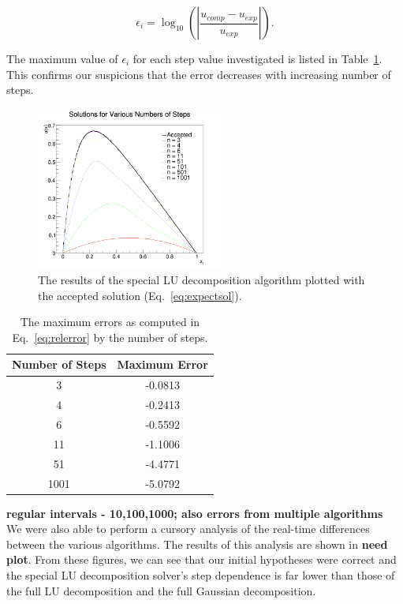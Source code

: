 \documentclass[12pt]{article}
\numberwithin{equation}{section}
\begin{document}
\begin{equation}
\label{eq:relerror}
\epsilon_{i} = \log_{10}\left(\left|\frac{u_{comp}-u_{exp}}{u_{exp}}\right|\right).
\end{equation}

\noindent The maximum value of $\epsilon_{i}$ for each step value investigated is listed in Table~\ref{tab:errors}.  This confirms our suspicions that the error decreases with increasing number of steps.

\begin{figure}[h]
\label{fig:result}
\begin{center}
\includegraphics[width=0.55\textwidth]{plots/solution_plot}
\caption{The results of the special LU decomposition algorithm plotted with the accepted solution (Eq.~\ref{eq:expectsol}).}
\end{center}
\end{figure}

\begin{table}[!h!tbp]
\label{tab:errors}
\begin{center}
\begin{tabular}{c|c}
\hline
Number of Steps & Maximum Error \\
\hline
3 & -0.0813 \\
4 & -0.2413 \\
6 & -0.5592 \\
11 & -1.1006 \\
51 & -4.4771 \\
1001 & -5.0792 \\
\hline
\end{tabular}
\caption{The maximum errors as computed in Eq.~\ref{eq:relerror} by the number of steps.}
\end{center}
\end{table}

\textbf{regular intervals - 10,100,1000; also errors from multiple algorithms}
\\\indent We were also able to perform a cursory analysis of the real-time differences between the various algorithms.  The results of this analysis are shown in \textbf{need plot}.  From these figures, we can see that our initial hypotheses were correct and the special LU decomposition solver's step dependence is far lower than those of the full LU decomposition and the full Gaussian decomposition.
\end{document}
